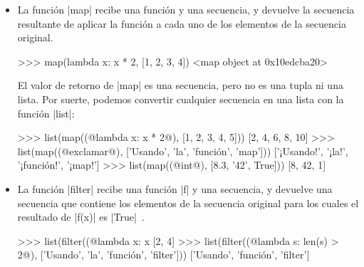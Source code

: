 \begin{subappendices}
\begin{itemize}
Podemos pasarle a |sorted| un parámetro adicional, que es una función que determina para
cada elemento el valor utilizado para ordenar. Por ejemplo, si queremos ordenar
las cadenas según su longitud (de menor a mayor), tenemos que pasarle a
|sorted| una función que recibe una cadena y devuelve su longitud. Esa función
no es otra que la función |len|:

\begin{codigo-python-sn}
>>> sorted(L, (@key=len@))(~\footnote{\texttt{key=len} indica que el parámetro adicional es un \emph{parámetro con nombre} (en inglés \emph{keyword argument}): el nombre del parámetro es \texttt{key} y el valor es \texttt{len}.}~)
['', '935', '1312', 'gato', 'zorro', '-----', 'alpaca']
\end{codigo-python-sn}

\item
La función |map| recibe una función y una secuencia, y devuelve la secuencia
resultante de aplicar la función a cada uno de los elementos de la secuencia
original.

\begin{codigo-python-sn}
>>> map(lambda x: x * 2, [1, 2, 3, 4])
<map object at 0x10edcba20>
\end{codigo-python-sn}

El valor de retorno de |map| es una secuencia, pero no es una tupla ni una
lista. Por suerte, podemos convertir cualquier secuencia en una lista con la
función |list|:

\begin{codigo-python-sn}
>>> list(map((@lambda x: x * 2@), [1, 2, 3, 4, 5]))
[2, 4, 6, 8, 10]
>>> list(map((@exclamar@), ['Usando', 'la', 'función', 'map']))
['¡Usando!', '¡la!', '¡función!', '¡map!']
>>> list(map((@int@), [8.3, '42', True]))
[8, 42, 1]
\end{codigo-python-sn}

\item
La función |filter| recibe una función |f| y una secuencia, y devuelve una secuencia
que contiene los elementos de la secuencia original para los cuales el
resultado de |f(x)| es |True|~.

\begin{codigo-python-sn}
>>> list(filter((@lambda x: x %
[2, 4]
>>> list(filter((@lambda s: len(s) > 2@), ['Usando', 'la', 'función', 'filter']))
['Usando', 'función', 'filter']
\end{codigo-python-sn}

\end{itemize}
\end{subappendices}
